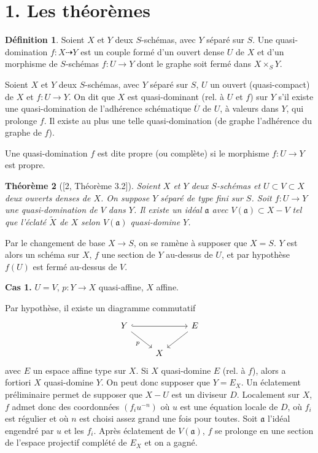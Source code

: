 \documentclass[11pt,a4paper]{article}
\theoremstyle{plain}
\newtheorem{theorem}{Th\'eor\`eme}
\theoremstyle{definition}
\newtheorem{definition}[theorem]{D\'efinition}
\begin{document}
\section*{1. Les th\'eor\`emes}

\begin{definition}
Soient $X$ et $Y$ deux $S$-sch\'emas, avec $Y$ s\'epar\'e sur $S$. Une quasi-domination $f: X \dashrightarrow Y$ est un couple form\'e d'un ouvert dense $U$ de $X$ et d'un morphisme de $S$-sch\'emas $f: U \to Y$ dont le graphe soit ferm\'e dans $X \times_S Y$.

Soient $X$ et $Y$ deux $S$-sch\'emas, avec $Y$ s\'epar\'e sur $S$, $U$ un ouvert (quasi-compact) de $X$ et $f: U \to Y$. On dit que $X$ est quasi-dominant (rel. \`a $U$ et $f$) sur $Y$ s'il existe une quasi-domination de l'adh\'erence sch\'ematique $\overline{U}$ de $U$, \`a valeurs dans $Y$, qui prolonge $f$. Il existe au plus une telle quasi-domination (de graphe l'adh\'erence du graphe de $f$).

Une quasi-domination $f$ est dite propre (ou compl\`ete) si le morphisme $f: U \to Y$ est propre.
\end{definition}

\begin{theorem}[{[2, Th\'eor\`eme 3.2]}]
Soient $X$ et $Y$ deux $S$-sch\'emas et $U \subset V \subset X$ deux ouverts denses de $X$. On suppose $Y$ s\'epar\'e de type fini sur $S$. Soit $f: U \to Y$ une quasi-domination de $V$ dans $Y$. Il existe un id\'eal $\mathfrak{a}$ avec $V(\mathfrak{a}) \subset X - V$ tel que l'\'eclat\'e $\widetilde{X}$ de $X$ selon $V(\mathfrak{a})$ quasi-domine $Y$.
\end{theorem}

Par le changement de base $X \to S$, on se ram\`ene \`a supposer que $X = S$. $Y$ est alors un sch\'ema sur $X$, $f$ une section de $Y$ au-dessus de $U$, et par hypoth\`ese $f(U)$ est ferm\'e au-dessus de $V$.

\smallskip
\noindent\textbf{Cas 1.} $U = V$, $p: Y \to X$ quasi-affine, $X$ affine.

Par hypoth\`ese, il existe un diagramme commutatif
\[
\begin{tikzcd}
Y \arrow[rr, hook] \arrow[dr, "p"'] & & E \arrow[dl] \\
& X
\end{tikzcd}
\]
avec $E$ un espace affine type sur $X$. Si $X$ quasi-domine $E$ (rel. \`a $f$), alors a fortiori $X$ quasi-domine $Y$. On peut donc supposer que $Y = E_X$. Un \'eclatement pr\'eliminaire permet de supposer que $X - U$ est un diviseur $D$. Localement sur $X$, $f$ admet donc des coordonn\'ees $(f_i u^{-n})$ o\`u $u$ est une \'equation locale de $D$, o\`u $f_i$ est r\'egulier et o\`u $n$ est choisi assez grand une fois pour toutes. Soit $\mathfrak{a}$ l'id\'eal engendr\'e par $u$ et les $f_i$. Apr\`es \'eclatement de $V(\mathfrak{a})$, $f$ se prolonge en une section de l'espace projectif compl\'et\'e de $E_X$ et on a gagn\'e.
\end{document}
